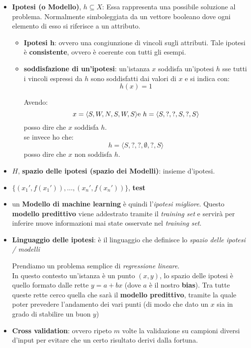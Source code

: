 \begin{shaded}
\begin{itemize}
    \item \textbf{Ipotesi (o Modello)}, $h\subseteq X$: Essa rappresenta una possibile soluzione al problema. Normalmente simboleggiata da un vettore booleano dove ogni elemento di esso si riferisce a un attributo.
    \begin{itemize}
        \item \textbf{Ipotesi h}: ovvero una congiunzione di vincoli sugli
    attributi. Tale ipotesi è \textbf{consistente}, ovvero è coerente con tutti gli esempi.
    \item \textbf{soddisfazione di un'ipotesi}: un'istanza $x$ soddisfa
    un'ipotesi $h$ sse tutti i vincoli espressi da $h$ sono soddisfatti dai
    valori di $x$ e si indica con:
    \[h(x)=1\]
    \begin{esempio}
      Avendo:
      \[x=\langle S, W, N, S, W, S\rangle \mbox{\textnormal{e}
        }h=\langle S,?,?, S,?, S\rangle\]
      posso dire che $x$ soddisfa $h$.\\
      se invece ho che:
      \[h=\langle S,?,?,\emptyset,?, S\rangle\]
      posso dire che $x$ non soddisfa $h$.
    \end{esempio} 
    \end{itemize}
    
    \item $H$, \textbf{spazio delle ipotesi (spazio dei Modelli)}: insieme d'ipotesi.
    
    
    \item $\{(x_1', f(x_1')),\ldots,(x_n', f(x_n'))\}$, \textbf{test}
    
    
    \item un \textbf{Modello di machine learning} è
    quindi l'\textit{ipotesi migliore}. Questo \textbf{modello predittivo} viene
    addestrato tramite il \textit{training set} e servirà per inferire nuove
    informazioni mai state osservate nel \textit{training set}. 
    
    
    \item \textbf{Linguaggio delle ipotesi}: è il linguaggio che definisce lo
    \textit{spazio delle ipotesi / modelli}
    \begin{esempio}
      Prendiamo un problema semplice di \textit{regressione lineare}.\\
      In questo contesto un'istanza è un punto $(x, y)$, lo spazio delle ipotesi
      è quello formato dalle rette $y=a+bx$ (dove $a$ è il nostro
      \textbf{bias}). Tra tutte queste rette cerco quella che sarà il
      \textbf{modello predittivo}, tramite la quale poter prevedere l'andamento
      dei vari punti (di modo che dato un $x$ sia in grado di stabilire un buon
      $y$)
    \end{esempio}
    
    \item \textbf{Cross validation}: ovvero ripeto $m$ volte la validazione su
    campioni diversi d'input per evitare che un certo risultato derivi dalla
    fortuna. 
  \end{itemize}
\end{shaded}


